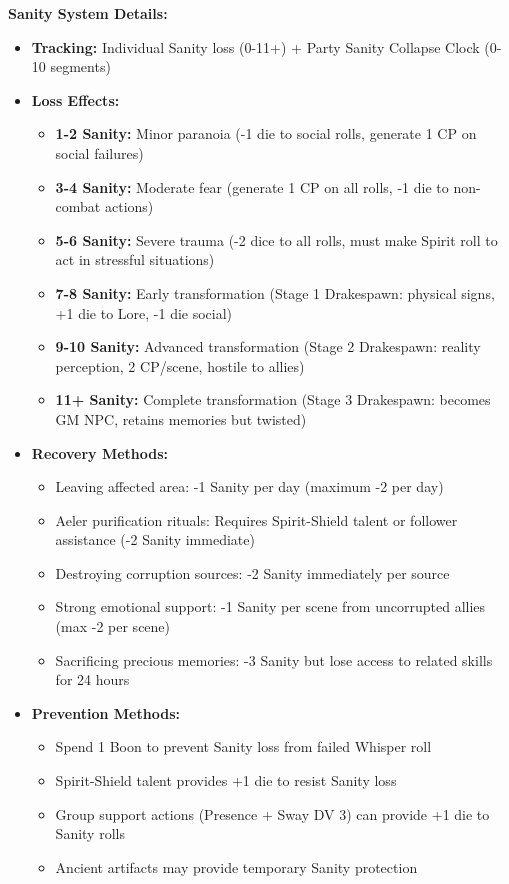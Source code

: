 \documentclass[11pt]{article}
\begin{document}
\textbf{Sanity System Details:}
\begin{itemize}
\item \textbf{Tracking:} Individual Sanity loss (0-11+) + Party Sanity Collapse Clock (0-10 segments)
\item \textbf{Loss Effects:}
  \begin{itemize}
  \item \textbf{1-2 Sanity:} Minor paranoia (-1 die to social rolls, generate 1 CP on social failures)
  \item \textbf{3-4 Sanity:} Moderate fear (generate 1 CP on all rolls, -1 die to non-combat actions)
  \item \textbf{5-6 Sanity:} Severe trauma (-2 dice to all rolls, must make Spirit roll to act in stressful situations)
  \item \textbf{7-8 Sanity:} Early transformation (Stage 1 Drakespawn: physical signs, +1 die to Lore, -1 die social)
  \item \textbf{9-10 Sanity:} Advanced transformation (Stage 2 Drakespawn: reality perception, 2 CP/scene, hostile to allies)
  \item \textbf{11+ Sanity:} Complete transformation (Stage 3 Drakespawn: becomes GM NPC, retains memories but twisted)
  \end{itemize}
\item \textbf{Recovery Methods:}
  \begin{itemize}
  \item Leaving affected area: -1 Sanity per day (maximum -2 per day)
  \item Aeler purification rituals: Requires Spirit-Shield talent or follower assistance (-2 Sanity immediate)
  \item Destroying corruption sources: -2 Sanity immediately per source
  \item Strong emotional support: -1 Sanity per scene from uncorrupted allies (max -2 per scene)
  \item Sacrificing precious memories: -3 Sanity but lose access to related skills for 24 hours
  \end{itemize}
\item \textbf{Prevention Methods:}
  \begin{itemize}
  \item Spend 1 Boon to prevent Sanity loss from failed Whisper roll
  \item Spirit-Shield talent provides +1 die to resist Sanity loss
  \item Group support actions (Presence + Sway DV 3) can provide +1 die to Sanity rolls
  \item Ancient artifacts may provide temporary Sanity protection
  \end{itemize}
\end{itemize}
\end{document}
